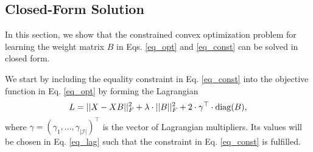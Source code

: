 \documentclass[sigconf]{acmart}
\newcommand{\W}{B}
\newcommand{\X}{X}
\newcommand{\Y}{X}
\newcommand{\I}{\mathcal{ I}}
\newcommand{\diag}{{\rm diag}}
\begin{document}
\subsection{Closed-Form Solution}
\label{sec_closedform}
In this section, we show that the constrained convex optimization problem for learning the weight matrix $\W$ in Eqs. \ref{eq_opt} and \ref{eq_const} can be solved in closed form. 

We start by including the equality constraint in Eq. \ref{eq_const} into the objective function in Eq. \ref{eq_opt} by forming the Lagrangian
\begin{equation}
L=||\Y-\X\W||_F^2 + \lambda\cdot||\W||_F^2 + 2\cdot\gamma^\top\cdot \diag(\W),
\nonumber
\end{equation}
where  $\gamma=(\gamma_1,...,\gamma_{|\I|})^\top$ is the vector of Lagrangian multipliers. Its values  will be chosen in  Eq. \ref{eq_lag} such that the constraint in Eq. \ref{eq_const} is fulfilled.
\end{document}
